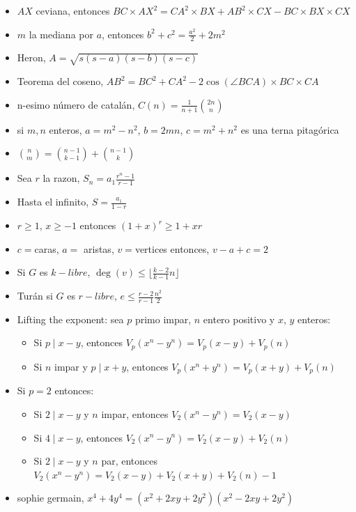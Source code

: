\begin{itemize}
\item $AX$ ceviana, entonces $BC \times AX^2 = CA^2 \times BX + AB^2 \times CX - BC \times BX \times CX$
\item $m$ la mediana por $a$, entonces $b^2 + c^2 = \frac{a^2}{2} + 2m^2$
\item Heron, $A = \sqrt{s(s-a)(s-b)(s-c)}$
\item Teorema del coseno, $AB^2 = BC^2 + CA^2 - 2 \cos(\angle BCA) \times BC \times CA$
\item n-esimo número de catalán, $C(n) = \frac{1}{n+1}\binom{2n}{n}$
\item si $m, n$ enteros, $a = m^2 - n^2$, $b = 2mn$, $c = m^2 + n^2$ es una terna pitagórica
\item $\binom{n}{m} = \binom{n-1}{k-1} + \binom{n-1}{k}$
\item Sea $r$ la razon, $S_n = a_1 \frac{r^n-1}{r-1}$
\item Hasta el infinito, $S = \frac{a_1}{1-r}$
\item $r \geq 1$, $x \geq -1$ entonces $(1 +x)^r \geq 1+xr$
\item $c=$caras, $a=$ aristas, $v=$vertices entonces, $v - a + c = 2$
\item Si $G$ es $k-libre$, $\deg(v) \leq \lfloor \frac{k-2}{k-1}n \rfloor$
\item Turán si $G$ es $r-libre$, $e \leq \frac{r-2}{r-1} \frac{n^2}{2}$
\item Lifting the exponent: sea $p$ primo impar, $n$ entero positivo y $x$, $y$ enteros:
\begin{itemize}
\item[$\square$] Si $p \mid x-y $, entonces $V_p(x^n - y^n) = V_p(x-y) + V_p(n)$ 
\item[$\square$] Si $n$ impar y $p \mid x+y $, entonces $V_p(x^n + y^n) = V_p(x+y) + V_p(n)$ 
\end{itemize}
\item Si $p = 2$ entonces:
\begin{itemize}
\item[$\square$] Si $2 \mid x-y $ y $n$ impar, entonces $V_2(x^n - y^n) = V_2(x-y)$ 
\item[$\square$] Si $4 \mid x-y $, entonces $V_2(x^n - y^n) = V_2(x-y) + V_2(n)$ 
\item[$\square$] Si $2 \mid x-y $ y $n$ par, entonces $V_2(x^n - y^n) = V_2(x-y) + V_2(x+y) + V_2(n) - 1$ 
\end{itemize}
\item sophie germain, $x^4 + 4y^4 = (x^2+2xy+2y^2) (x^2-2xy+2y^2)$

\end{itemize}
